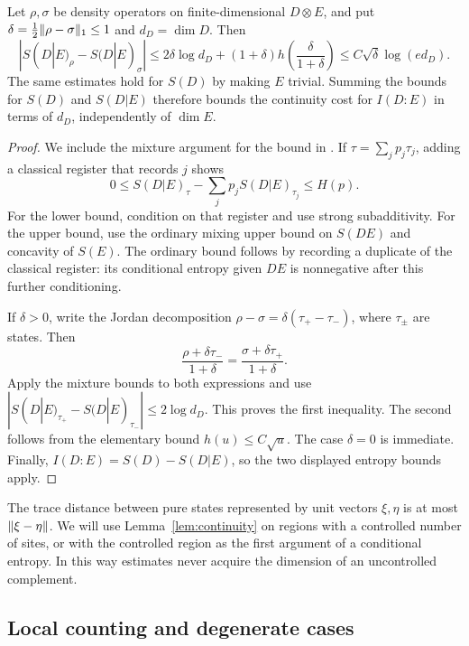 \begin{lemma}\label{lem:continuity}
Let $\rho,\sigma$ be density operators on finite-dimensional $D\otimes E$,
and put $\delta=\tfrac12\lVert \rho-\sigma\rVert_1\le1$ and $d_D=\dim D$.
Then
\begin{equation}\label{eq:conditional-continuity}
 |S(D|E)_\rho-S(D|E)_\sigma|
 \le2\delta\log d_D+(1+\delta)
                 h\left(\frac{\delta}{1+\delta}\right)
 \le C\sqrt\delta\log(e d_D).
\end{equation}
The same estimates hold for $S(D)$ by making $E$ trivial. Summing the
bounds for $S(D)$ and $S(D|E)$ therefore bounds the continuity cost for
$I(D:E)$ in terms of $d_D$, independently of $\dim E$.
\end{lemma}
\begin{proof}
We include the mixture argument for the bound in
\cite[Lemma~2]{Winter2016}. If $\tau=\sum_j p_j\tau_j$, adding a classical
register that records $j$ shows
\[
 0\le S(D|E)_\tau-\sum_jp_jS(D|E)_{\tau_j}\le H(p).
\]
For the lower bound, condition on that register and use strong
subadditivity. For the upper bound, use the ordinary mixing upper bound on
$S(DE)$ and concavity of $S(E)$. The ordinary bound follows by recording a
duplicate of the classical register: its conditional entropy given $DE$
is nonnegative after this further conditioning.

If $\delta>0$, write the Jordan decomposition
$\rho-\sigma=\delta(\tau_+-\tau_-)$, where $\tau_\pm$ are states.
Then
\[
 \frac{\rho+\delta\tau_-}{1+\delta}
 =\frac{\sigma+\delta\tau_+}{1+\delta}.
\]
Apply the mixture bounds to both expressions and use
$|S(D|E)_{\tau_+}-S(D|E)_{\tau_-}|\le2\log d_D$.
This proves the first inequality. The second follows from the elementary
bound $h(u)\le C\sqrt u$. The case $\delta=0$ is immediate.
Finally, $I(D:E)=S(D)-S(D|E)$, so the two displayed entropy bounds apply.
\end{proof}

The trace distance between pure states represented by unit vectors $\xi,\eta$
is at most $\lVert \xi-\eta\rVert$. We will use Lemma~\ref{lem:continuity} on
regions with a controlled number of sites, or with the controlled region as
the first argument of a conditional entropy. In this way estimates never
acquire the dimension of an uncontrolled complement.

\subsection{Local counting and degenerate cases}

